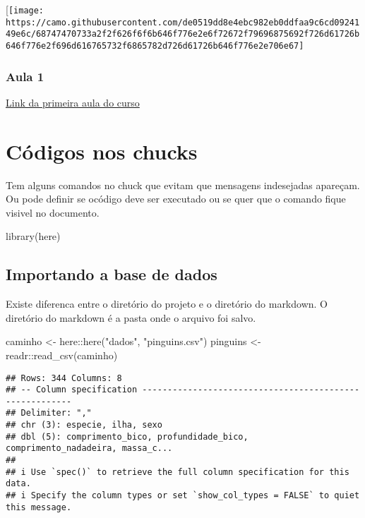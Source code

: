 \documentclass[
]{article}
\newenvironment{Shaded}{\begin{snugshade}}{\end{snugshade}}
\newcommand{\FunctionTok}[1]{\textcolor[rgb]{0.00,0.00,0.00}{#1}}
\newcommand{\NormalTok}[1]{#1}
\newcommand{\OtherTok}[1]{\textcolor[rgb]{0.56,0.35,0.01}{#1}}
\newcommand{\SpecialCharTok}[1]{\textcolor[rgb]{0.00,0.00,0.00}{#1}}
\newcommand{\StringTok}[1]{\textcolor[rgb]{0.31,0.60,0.02}{#1}}
\begin{document}
{[}\texttt{[image: https://camo.githubusercontent.com/de0519dd8e4ebc982eb0ddfaa9c6cd0924149e6c/68747470733a2f2f626f6f6b646f776e2e6f72672f79696875692f726d61726b646f776e2f696d616765732f6865782d726d61726b646f776e2e706e67]}

\hypertarget{aula-1}{%
\subsubsection{Aula 1}\label{aula-1}}

\href{https://cursosextensao.usp.br/course/view.php?id=2991\&section=4}{Link
da primeira aula do curso}

\hypertarget{cuxf3digos-nos-chucks}{%
\section{Códigos nos chucks}\label{cuxf3digos-nos-chucks}}

Tem alguns comandos no chuck que evitam que mensagens indesejadas
apareçam. Ou pode definir se ocódigo deve ser executado ou se quer que o
comando fique visivel no documento.

\begin{Shaded}
\begin{Highlighting}[]
\FunctionTok{library}\NormalTok{(here)}
\end{Highlighting}
\end{Shaded}

\hypertarget{importando-a-base-de-dados}{%
\subsection{Importando a base de
dados}\label{importando-a-base-de-dados}}

Existe diferenca entre o diretório do projeto e o diretório do markdown.
O diretório do markdown é a pasta onde o arquivo foi salvo.

\begin{Shaded}
\begin{Highlighting}[]
\NormalTok{caminho }\OtherTok{\textless{}{-}}\NormalTok{ here}\SpecialCharTok{::}\FunctionTok{here}\NormalTok{(}\StringTok{"dados"}\NormalTok{, }\StringTok{"pinguins.csv"}\NormalTok{) }
\NormalTok{pinguins }\OtherTok{\textless{}{-}}\NormalTok{ readr}\SpecialCharTok{::}\FunctionTok{read\_csv}\NormalTok{(caminho)}
\end{Highlighting}
\end{Shaded}

\begin{verbatim}
## Rows: 344 Columns: 8
## -- Column specification --------------------------------------------------------
## Delimiter: ","
## chr (3): especie, ilha, sexo
## dbl (5): comprimento_bico, profundidade_bico, comprimento_nadadeira, massa_c...
## 
## i Use `spec()` to retrieve the full column specification for this data.
## i Specify the column types or set `show_col_types = FALSE` to quiet this message.
\end{verbatim}
\end{document}
